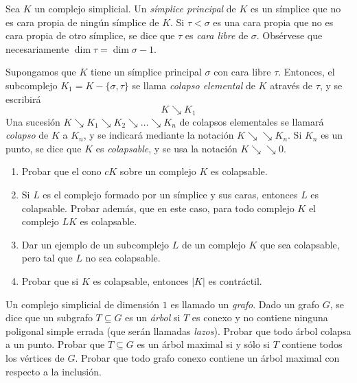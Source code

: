 \documentclass[twoside]{article}
\newcommand{\colapso}{{\searrow\!\!\!\!\searrow}}
\begin{document}
\begin{ejercicio}{1.6}
Sea $K$ un complejo simplicial.
Un \emph{símplice principal} de $K$ es un símplice que no es cara propia de ningún símplice de $K$.
Si $τ < σ$ es una cara propia que no es cara propia de otro símplice, se dice que $τ$ es \emph{cara libre} de $σ$.
Obsérvese que necesariamente $\dim τ = \dim σ - 1$.

Supongamos que $K$ tiene un símplice principal $σ$ con cara libre $τ$.
Entonces, el subcomplejo $K_1 = K - \{σ,τ\}$ se llama \emph{colapso elemental} de $K$ através de $τ$, y se escribirá
\[ K \searrow K_1 \]
Una sucesión $K \searrow K_1 \searrow K_2 \searrow \dots \searrow K_n$ de colapsos elementales se llamará \emph{colapso} de $K$ a $K_n$, y se indicará mediante la notación $K \colapso K_n$.
Si $K_n$ es un punto, se dice que $K$ es \emph{colapsable}, y se usa la notación $K \colapso 0$.
\begin{enumerate}
\item Probar que el cono $cK$ sobre un complejo $K$ es colapsable.
\item Si $L$ es el complejo formado por un símplice y sus caras, entonces $L$ es colapsable.
Probar además, que en este caso, para todo complejo $K$ el complejo $LK$ es colapsable.
\item Dar un ejemplo de un subcomplejo $L$ de un complejo $K$ que sea colapsable, pero tal que $L$ no sea colapsable.
\item Probar que si $K$ es colapsable, entonces $|K|$ es contráctil.
\end{enumerate}
\end{ejercicio}
\begin{solucion}
\end{solucion}

\newpage

\begin{ejercicio}{1.7}
Un complejo simplicial de dimensión $1$ es llamado un \emph{grafo}.
Dado un grafo $G$, se dice que un subgrafo $T \subseteq G$ es un \emph{árbol} si $T$ es conexo y no contiene ninguna poligonal simple errada (que serán llamadas \emph{lazos}).
Probar que todo árbol colapsa a un punto.
Probar que $T \subseteq G$ es un árbol maximal si y sólo si $T$ contiene todos los vértices de $G$.
Probar que todo grafo conexo contiene un árbol maximal con respecto a la inclusión.
\end{ejercicio}
\begin{solucion}
\end{solucion}
\end{document}
